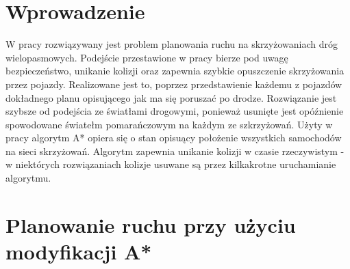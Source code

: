  \label{chap:thesis}


\section{Wprowadzenie}

W pracy rozwiązywany jest problem planowania ruchu na skrzyżowaniach dróg wielopasmowych. Podejście przestawione w pracy bierze pod uwagę bezpieczeństwo, unikanie kolizji oraz zapewnia szybkie opuszczenie skrzyżowania przez pojazdy. Realizowane jest to, poprzez przedstawienie każdemu z pojazdów dokładnego planu opisującego jak ma się poruszać po drodze. Rozwiązanie jest szybsze od podejścia ze światłami drogowymi, ponieważ usunięte jest opóźnienie spowodowane światełm pomarańczowym na każdym ze szkrzyżowań. Użyty w pracy algorytm A* opiera się o stan opisuący położenie wszystkich samochodów na sieci skrzyżowań. Algorytm zapewnia unikanie kolizji w czasie rzeczywistym - w niektórych rozwiązaniach kolizje usuwane są przez kilkakrotne uruchamianie algorytmu.

\section{Planowanie ruchu przy użyciu modyfikacji A*}

